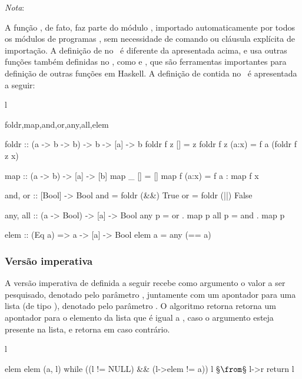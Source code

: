 \HRule
{\em Nota\/}: 

A função , de fato, faz parte do módulo \Prelude, importado
automaticamente por todos os módulos de programas \Haskell, sem
necessidade de comando ou cláusula explícita de importação. A
definição de  no \Prelude\ é diferente da apresentada acima,
e usa outras funções também definidas no \Prelude, como  e
, que são ferramentas importantes para definição de outras
funções em Haskell. A definição de  contida no \Prelude\ é
apresentada a seguir:

\begin{center}
\begin{tabular}{l}
\begin{hask}{foldr,map,and,or,any,all,elem}{\decremento}

foldr  :: (a -> b -> b) -> b -> [a] -> b
foldr f z []    =  z
foldr f z (a:x) =  f a (foldr f z x) 

map :: (a -> b) -> [a] -> [b]
map _  []   = []
map f (a:x) = f a : map f x 

and, or :: [Bool] -> Bool
and =  foldr (&&) True
or  =  foldr (||) False 

any, all :: (a -> Bool) -> [a] -> Bool
any p =  or . map p
all p =  and . map p 

elem :: (Eq a) => a -> [a] -> Bool
elem a = any (== a)
\end{hask}
\end{tabular}
\end{center}

\HRule

\subsubsection{Versão imperativa}
\label{pesquisa-sequencial-em-arranjo-versao-imp}

A versão imperativa de  definida a seguir recebe como
argumento o valor a ser pesquisado, denotado pelo parâmetro ,
juntamente com um apontador para uma lista (de tipo
), denotado pelo parâmetro . O algoritmo
retorna retorna um apontador para o elemento da lista  que é
igual a , caso o argumento esteja presente na lista, e retorna
 em caso contrário.  

\begin{center}
\begin{tabular}{l}
\begin{alg}{elem}{\decremento}
elem (a, l) 
   while ((l != NULL) && (l->elem != a)) l §$\from$§ l->r
   return l
\end{alg}
\end{tabular}
\end{center}

